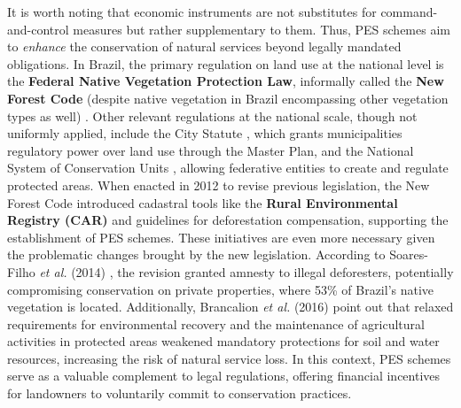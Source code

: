 \documentclass[./main_en.tex]{subfiles}
\begin{document}
\par It is worth noting that economic instruments are not substitutes for command-and-control measures but rather supplementary to them. Thus, PES schemes aim to \textit{enhance} the conservation of natural services beyond legally mandated obligations. In Brazil, the primary regulation on land use at the national level is the \textbf{Federal Native Vegetation Protection Law}, informally called the \textbf{New Forest Code} (despite native vegetation in Brazil encompassing other vegetation types as well) \cite{brasil12651}. Other relevant regulations at the national scale, though not uniformly applied, include the City Statute \cite{brasil2021}, which grants municipalities regulatory power over land use through the Master Plan, and the National System of Conservation Units \cite{Brasil2000}, allowing federative entities to create and regulate protected areas. When enacted in 2012 to revise previous legislation, the New Forest Code introduced cadastral tools like the \textbf{Rural Environmental Registry (CAR)} and guidelines for deforestation compensation, supporting the establishment of PES schemes. These initiatives are even more necessary given the problematic changes brought by the new legislation. According to Soares-Filho \textit{et al.} (2014) \cite{Soares-filho2014a}, the revision granted amnesty to illegal deforesters, potentially compromising conservation on private properties, where 53\% of Brazil’s native vegetation is located. Additionally, Brancalion \textit{et al.} (2016) \cite{Brancalion2016a} point out that relaxed requirements for environmental recovery and the maintenance of agricultural activities in protected areas weakened mandatory protections for soil and water resources, increasing the risk of natural service loss. In this context, PES schemes serve as a valuable complement to legal regulations, offering financial incentives for landowners to voluntarily commit to conservation practices.
\end{document}
